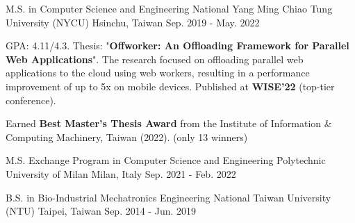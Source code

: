 
\vspace{-2mm}

\begin{cventries}

  
\cventry
  {M.S. in Computer Science and Engineering} %
  {National Yang Ming Chiao Tung University (NYCU)} %
  {Hsinchu, Taiwan} %
  {Sep. 2019 - May. 2022} %
  {
    \begin{cvitems} %
      \item {GPA: 4.11/4.3. Thesis: "\textbf{Offworker: An Offloading Framework for Parallel Web Applications}".
      The research focused on offloading parallel web applications to the cloud using web workers,
      resulting in a performance improvement of up to 5x on mobile devices. Published at \textbf{WISE'22} (top-tier conference).
      }
      \item {Earned \textbf{Best Master's Thesis Award} from the Institute of Information \& Computing Machinery, Taiwan (2022). (only 13 winners)}
    \end{cvitems}
  }

  \vspace{-3mm}

\cventry
    {M.S. Exchange Program in Computer Science and Engineering} %
    {Polytechnic University of Milan} %
    {Milan, Italy} %
    {Sep. 2021 - Feb. 2022} %
    {}

  \vspace{-10mm}

\cventry
    {B.S. in Bio-Industrial Mechatronics Engineering} %
    {National Taiwan University (NTU)} %
    {Taipei, Taiwan} %
    {Sep. 2014 - Jun. 2019} %
    {
    }

  \vspace{-10mm}

\end{cventries}
